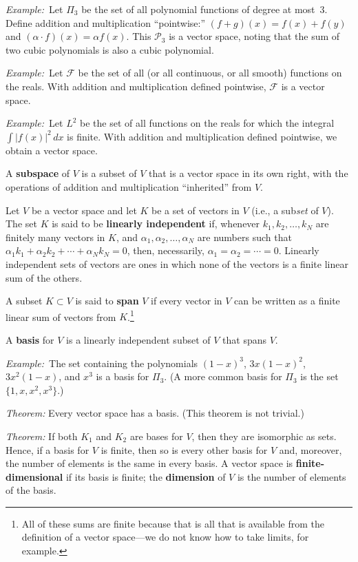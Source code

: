 \documentclass[10pt, a4paper, twocolumn]{article}
\newcommand{\defn}[1]{\textbf{#1}}
\newcommand{\eg}{\emph{Example:}\relax}
\begin{document}
\eg\ Let $\Pi_3$ be the set of all polynomial functions of degree at
most~3. Define addition and multiplication “pointwise:” $(f + g)(x) = f(x) +
f(y)$ and $(\alpha \cdot f)(x) = \alpha f(x)$. This $\mathcal{P}_3$ is a vector space, noting
that the sum of two cubic polynomials is also a cubic polynomial.

\eg\ Let $\mathcal{F}$ be the set of all (or all continuous, or all smooth)
functions on the reals. With addition and multiplication defined pointwise,
$\mathcal{F}$ is a vector space.

\eg\ Let $L^2$ be the set of all functions on the reals for which the integral
$\int |f(x)|^2\,dx$ is finite. With addition and multiplication defined pointwise,
we obtain a vector space.

A \defn{subspace} of $V$ is a subset of $V$ that is a vector space in its own
right, with the operations of addition and multiplication “inherited” from $V$.

Let $V$ be a vector space and let $K$ be a set of vectors in $V$ (i.e., a
sub\emph{set} of $V$). The set $K$ is said to be \defn{linearly independent} if,
whenever $k_1, k_2, \dotsc, k_N$ are finitely many vectors in $K$, and $\alpha_1,
\alpha_2, \dotsc, \alpha_N$ are numbers such that $\alpha_1 k_1 + \alpha_2 k_2 + \dotsb + \alpha_N k_N =
0$, then, necessarily, $\alpha_1 = \alpha_2 = \dotsb = 0$. Linearly independent sets of
vectors are ones in which none of the vectors is a finite linear sum of the
others.

A subset $K \subset V$ is said to \defn{span} $V$ if every vector in $V$ can be
written as a finite linear sum of vectors from $K$.\footnote{All of these sums
  are finite because that is all that is available from the definition of a
  vector space---we do not know how to take limits, for example.}

A \defn{basis} for $V$ is a linearly independent subset of $V$ that spans $V$.

\eg\ The set containing the polynomials $(1-x)^3$, $3x(1-x)^2$, $3x^2(1-x)$, and
$x^3$ is a basis for $\Pi_3$. (A more common basis for $\Pi_3$ is the set $\{1, x,
x^2, x^3\}$.)

\emph{Theorem:} Every vector space has a basis. (This theorem is not trivial.)

\emph{Theorem:} If both $K_1$ and $K_2$ are bases for $V$, then they are
isomorphic as sets. Hence, if a basis for $V$ is finite, then so is every other
basis for $V$ and, moreover, the number of elements is the same in every
basis. A vector space is \defn{finite-dimensional} if its basis is finite; the
\defn{dimension} of $V$ is the number of elements of the basis.
\end{document}
